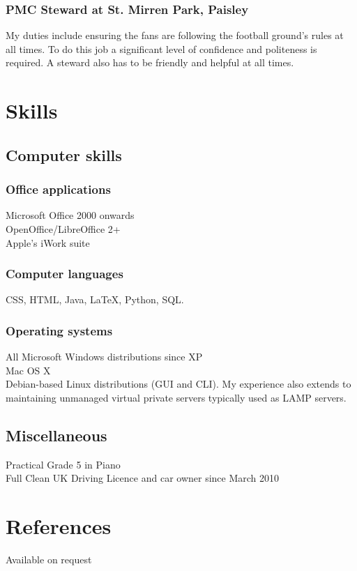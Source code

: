 \documentclass[10pt,a4paper]{article}
\begin{document}
\subsubsection*{PMC Steward at St. Mirren Park, Paisley}
My duties include ensuring the fans are following the football ground's rules at all times. To do this job a significant level of confidence and politeness is required. A steward also has to be friendly and helpful at all times.
\section*{Skills}
\subsection*{Computer skills}
\subsubsection*{Office applications}
Microsoft Office 2000 onwards\\
OpenOffice/LibreOffice 2+\\
Apple's iWork suite
\subsubsection*{Computer languages}
CSS, HTML, Java, \LaTeX, Python, SQL.
\subsubsection*{Operating systems}
All Microsoft Windows distributions since XP\\
Mac OS X\\
Debian-based Linux distributions (GUI and CLI). My experience also extends to maintaining unmanaged virtual private servers typically used as LAMP servers.
\subsection*{Miscellaneous}
Practical Grade 5 in Piano\\
Full Clean UK Driving Licence and car owner since March 2010
\section*{References}
Available on request
\end{document}

